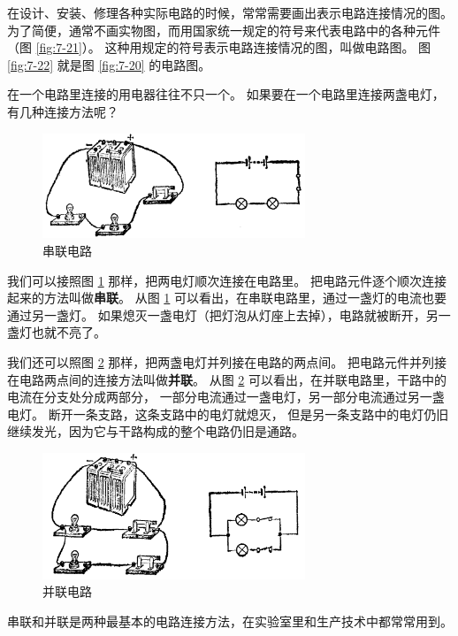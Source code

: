 在设计、安装、修理各种实际电路的时候，常常需要画出表示电路连接情况的图。
为了简便，通常不画实物图，而用国家统一规定的符号来代表电路中的各种元件（图 \ref{fig:7-21}）。
这种用规定的符号表示电路连接情况的图，叫做电路图。
图 \ref{fig:7-22} 就是图 \ref{fig:7-20} 的电路图。


在一个电路里连接的用电器往往不只一个。
如果要在一个电路里连接两盏电灯，有几种连接方法呢？

\begin{figure}[htbp]
    \centering
    \includegraphics[width=0.7\textwidth]{../pic/czwl2-ch7-23}
    \caption{串联电路}\label{fig:7-23}
\end{figure}

我们可以接照图 \ref{fig:7-23} 那样，把两电灯顺次连接在电路里。
把电路元件逐个顺次连接起来的方法叫做\textbf{串联}。
从图 \ref{fig:7-23} 可以看出，在串联电路里，通过一盏灯的电流也要通过另一盏灯。
如果熄灭一盏电灯（把灯泡从灯座上去掉），电路就被断开，另一盏灯也就不亮了。


我们还可以照图 \ref{fig:7-24} 那样，把两盏电灯并列接在电路的两点间。
把电路元件并列接在电路两点间的连接方法叫做\textbf{并联}。
从图 \ref{fig:7-24} 可以看出，在并联电路里，干路中的电流在分支处分成两部分，
一部分电流通过一盏电灯，另一部分电流通过另一盏电灯。
断开一条支路，这条支路中的电灯就熄灭，
但是另一条支路中的电灯仍旧继续发光，因为它与干路构成的整个电路仍旧是通路。

\begin{figure}[htbp]
    \centering
    \includegraphics[width=0.7\textwidth]{../pic/czwl2-ch7-24}
    \caption{并联电路}\label{fig:7-24}
\end{figure}


串联和并联是两种最基本的电路连接方法，在实验室里和生产技术中都常常用到。

